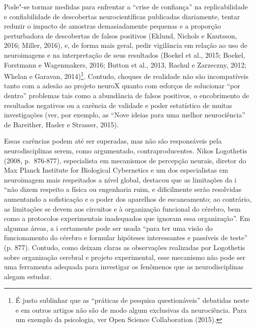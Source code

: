 Pode"-se tormar medidas para enfrentar a ``crise de confiança'' na
replicabilidade e confiabilidade de descobertas neurocientíficas
publicadas diariamente, tentar reduzir o impacto de amostras
demasiadamente pequenas e a proporção perturbadora de descobertas de
falsos positivos (Eklund, Nichols e Knutsson, 2016; Miller, 2016), e, de
forma mais geral, pedir vigilância em relação ao uso de neuroimagens e
na interpretação de seus resultados (Boekel et al., 2015; Boekel,
Forstmann e Wagenmakers, 2016; Button et al., 2013, Rachul e Zarzeczny,
2012; Whelan e Garavan, 2014)\footnote[9]{É justo sublinhar que as ``práticas de pesquisa questionáveis''
debatidas neste e em outros artigos não são de modo algum exclusivas da
neurociência. Para um exemplo da psicologia, ver Open Science
Collaboration (2015).}. Contudo, choques de
realidade não são incompatíveis tanto com a adesão ao projeto neuroX
quanto com esforços de solucionar ``por dentro'' problemas tais como a
abundância de falsos positivos, o encobrimento de resultados negativos
ou a carência de validade e poder estatístico de muitas investigações
(ver, por exemplo, as ``Nove ideias para uma melhor neurociência'' de
Bareither, Hasler e Strasser, 2015).

Essas carências podem até ser superadas, mas não são responsáveis pela
neurodisciplinas serem, como argumentado, contraproducentes. Nikos
Logothetis (2008, p.~876-877), especialista em mecanismos de percepção
neurais, diretor do Max Planck Institute for Biological Cybernetics e um
dos especialistas em neuroimagem mais respeitados a nível global,
destacou que as limitações da i ``não dizem respeito a física ou
engenharia ruim, e dificilmente serão resolvidas aumentando a
sofisticação e o poder dos aparelhos de escaneamento; ao contrário, as
limitações se devem aos circuitos e à organização funcional do cérebro,
bem como a protocolos experimentais inadequados que ignoram essa
organização''. Em algumas áreas, a i certamente pode ser usada ``para
ter uma visão do funcionamento do cérebro e formular hipóteses
interessantes e passíveis de teste'' (p. 877). Contudo, como deixam
claras as observações realizadas por Logothetis sobre organização
cerebral e projeto experimental, esse mecanismo não pode ser uma
ferramenta adequada para investigar os fenômenos que as neurodisciplinas
alegam estudar.

